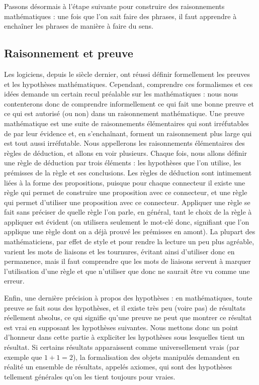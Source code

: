 Passons désormais à l'étape suivante pour construire des raisonnements mathématiques : une fois que l'on sait faire des phrases, il faut apprendre à enchaîner les phrases de manière à faire du sens.

\subsection{Raisonnement et preuve}

Les logiciens, depuis le siècle dernier, ont réussi définir formellement les preuves et les hypothèses mathématiques. Cependant, comprendre ces formalismes et ces idées demande un certain recul préalable sur les mathématiques : nous nous contenterons donc de comprendre informellement ce qui fait une bonne preuve et ce qui est autorisé (ou non) dans un raisonnement mathématique. Une preuve mathématique est une suite de raisonnements élémentaires qui sont irréfutables de par leur évidence et, en s'enchaînant, forment un raisonnement plus large qui est tout aussi irréfutable. Nous appellerons les raisonnements élémentaires des règles de déduction, et allons en voir plusieurs. Chaque fois, nous allons définir une règle de déduction par trois éléments : les hypothèses que l'on utilise, les prémisses de la règle et ses conclusions. Les règles de déduction sont intimement liées à la forme des propositions, puisque pour chaque connecteur il existe une règle qui permet de construire une proposition avec ce connecteur, et une règle qui permet d'utiliser une proposition avec ce connecteur. Appliquer une règle se fait sans préciser de quelle règle l'on parle, en général, tant le choix de la règle à appliquer est évident (on utilisera seulement le mot-clé \og donc\fg{}, signifiant que l'on applique une règle dont on a déjà prouvé les prémisses en amont). La plupart des mathématiciens, par effet de style et pour rendre la lecture un peu plus agréable, varient les mots de liaisons et les tournures, évitant ainsi d'utiliser \og donc\fg{} en permanence, mais il faut comprendre que les mots de liaisons servent à marquer l'utilisation d'une règle et que n'utiliser que \og donc\fg{} ne saurait être vu comme une erreur.

Enfin, une dernière précision à propos des hypothèses : en mathématiques, toute preuve se fait sous des hypothèses, et il existe très peu (voire pas) de résultats réellement absolus, ce qui signifie qu'une preuve ne peut que montrer \og ce résultat est vrai en supposant les hypothèses suivantes\fg{}. Nous mettons donc un point d'honneur dans cette partie à expliciter les hypothèses sous lesquelles tient un résultat. Si certains résultats apparaissent comme universellement vrais (par exemple que $1+1=2$), la formalisation des objets manipulés demandent en réalité un ensemble de résultats, appelés axiomes, qui sont des hypothèses tellement générales qu'on les tient toujours pour vraies.

